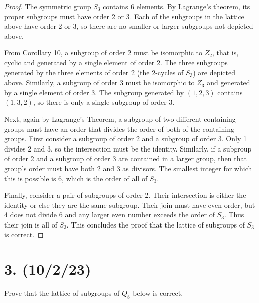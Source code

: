 \documentclass{article}
\begin{document}
\begin{proof}
    The symmetric group $S_3$ contains 6 elements. By Lagrange's theorem, its proper subgroups must have order 2 or 3. Each of the subgroups in the lattice above have order 2 or 3, so there are no smaller or larger subgroups not depicted above.

    From Corollary 10, a subgroup of order 2 must be isomorphic to $Z_2$, that is, cyclic and generated by a single element of order 2. The three subgroups generated by the three elements of order 2 (the 2-cycles of $S_3$) are depicted above. Similarly, a subgroup of order 3 must be isomorphic to $Z_3$ and generated by a single element of order 3. The subgroup generated by $(1, 2, 3)$ contains $(1, 3, 2)$, so there is only a single subgroup of order 3.

    Next, again by Lagrange's Theorem, a subgroup of two different containing groups must have an order that divides the order of both of the containing groups. First consider a subgroup of order 2 and a subgroup of order 3. Only 1 divides 2 and 3, so the intersection must be the identity. Similarly, if a subgroup of order 2 and a subgroup of order 3 are contained in a larger group, then that group's order must have both 2 and 3 as divisors. The smallest integer for which this is possible is 6, which is the order of all of $S_3$.

    Finally, consider a pair of subgroups of order 2. Their intersection is either the identity or else they are the same subgroup. Their join must have even order, but 4 does not divide 6 and any larger even number exceeds the order of $S_3$. Thus their join is all of $S_3$. This concludes the proof that the lattice of subgroups of $S_3$ is correct.
\end{proof}

\section*{3. (10/2/23)}

Prove that the lattice of subgroups of $Q_8$ below is correct.

\begin{center}
\end{center}
\end{document}
